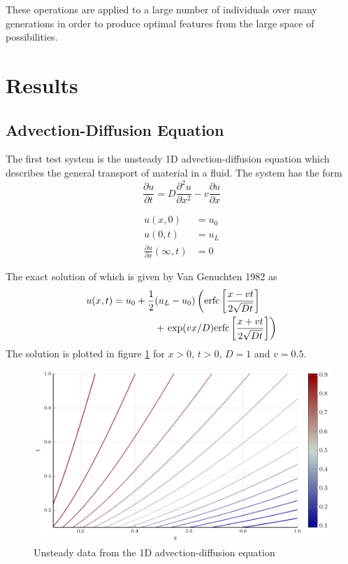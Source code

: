 \documentclass{article}
\begin{document}
These operations are applied to a large number of individuals over many generations in order to produce optimal features from the large space of possibilities.


\section{Results}
\label{results}


\subsection{Advection-Diffusion Equation}

The first test system is the unsteady 1D advection-diffusion equation which describes the general transport of material in a fluid. The system has the form
\[ \frac{\partial u}{\partial t} = D\frac{\partial^2 u}{\partial x^2} - v \frac{\partial u}{\partial x} \]

\begin{align}
  u(x,0) &= u_0 \\
  u(0,t) &= u_L \\
  \frac{\partial u}{\partial x}(\infty, t) &= 0
\end{align}

The exact solution of which is given by Van Genuchten 1982 as
\begin{equation}
  \begin{split}
  u(x,t) = u_0 + \frac{1}{2}&(u_L - u_0) \left({\rm erfc}\left[ \frac{x - vt}{2\sqrt{Dt}}\right]\right. \\
  &+ \left.{\rm exp}(vx/D) {\rm erfc}\left[ \frac{x + vt}{2\sqrt{Dt}}\right] \right)
  \end{split}
\end{equation}
The solution is plotted in figure \ref{fig:advdif} for $x>0$, $t>0$, $D=1$ and $v=0.5$.

\begin{figure}[ht]
\vskip 0.2in
\begin{center}
\centerline{\includegraphics[width=\columnwidth]{./figures/advdif}}
\caption{Unsteady data from the 1D advection-diffusion equation}
\label{fig:advdif}
\end{center}
\vskip -0.2in
\end{figure}
\end{document}
